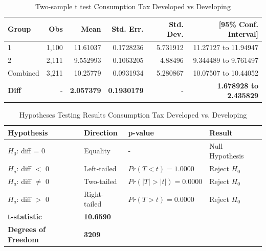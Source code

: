 \documentclass[12pt]{article}
\begin{document}
\begin{table}[H]
\centering
\caption{Two-sample t test Consumption Tax Developed vs Developing}
\label{tab:ttest_equal_variances}
\renewcommand{\arraystretch}{1.2} %
\begin{tabular}{|l|r|r|r|r|r|}
\hline
\textbf{Group} & \textbf{Obs} & \textbf{Mean} & \textbf{Std. Err.} & \textbf{Std. Dev.} & \textbf{[95\% Conf. Interval]} \\ \hline
1              & 1,100        & 11.61037      & 0.1728236          & 5.731912          & 11.27127 to 11.94947           \\ \hline
2              & 2,111        & 9.552993      & 0.1063205          & 4.88496           & 9.344489 to 9.761497           \\ \hline
Combined       & 3,211        & 10.25779      & 0.0931934          & 5.280867          & 10.07507 to 10.44052           \\ \hline
\textbf{Diff}  & -            & \textbf{2.057379} & \textbf{0.1930179} & -                 & \textbf{1.678928 to 2.435829}  \\ \hline
\end{tabular}
\end{table}



\begin{table}[H]
\centering
\caption{Hypotheses Testing Results Consumption Tax Developed vs. Developing}
\label{tab:hypothesis_test_results}
\renewcommand{\arraystretch}{1.2} %
\begin{tabular}{|l|l|l|l|}
\hline
\textbf{Hypothesis}          & \textbf{Direction} & \textbf{p-value}      & \textbf{Result}        \\ \hline
$H_0$: diff = 0              & Equality           & -                     & Null Hypothesis        \\ \hline
$H_a$: diff $<$ 0            & Left-tailed        & $Pr(T < t) = 1.0000$  & Reject $H_0$           \\ \hline
$H_a$: diff $\neq$ 0         & Two-tailed         & $Pr(|T| > |t|) = 0.0000$ & Reject $H_0$        \\ \hline
$H_a$: diff $>$ 0            & Right-tailed       & $Pr(T > t) = 0.0000$  & Reject $H_0$           \\ \hline
\textbf{t-statistic}         & \textbf{10.6590}   &                       &                        \\ \hline
\textbf{Degrees of Freedom}  & \textbf{3209}      &                       &                        \\ \hline
\end{tabular}
\end{table}
\end{document}

